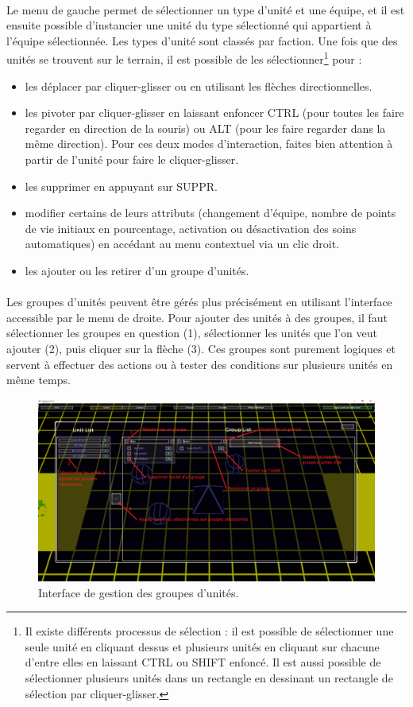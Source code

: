 \documentclass[a4paper]{article}
\begin{document}
\paragraph{ }
Le menu de gauche permet de sélectionner un type d'unité et une équipe, et il est ensuite possible d'instancier une unité du type sélectionné qui appartient à l'équipe sélectionnée. Les types d'unité sont classés par faction. Une fois que des unités se trouvent sur le terrain, il est possible de les sélectionner\footnote{Il existe différents processus de sélection : il est possible de sélectionner une seule unité en cliquant dessus et plusieurs unités en cliquant sur chacune d'entre elles en laissant CTRL ou SHIFT enfoncé. Il est aussi possible de sélectionner plusieurs unités dans un rectangle en dessinant un rectangle de sélection par cliquer-glisser.} pour :
\begin{itemize}
\item les déplacer par cliquer-glisser ou en utilisant les flèches directionnelles.
\item les pivoter par cliquer-glisser en laissant enfoncer CTRL (pour toutes les faire regarder en direction de la souris) ou ALT (pour les faire regarder dans la même direction). Pour ces deux modes d'interaction, faites bien attention à partir de l'unité pour faire le cliquer-glisser. 
\item les supprimer en appuyant sur SUPPR.
\item modifier certains de leurs attributs (changement d'équipe, nombre de points de vie initiaux en pourcentage, activation ou désactivation des soins automatiques) en accédant au menu contextuel via un clic droit.
\item les ajouter ou les retirer d'un groupe d'unités.
\end{itemize}
\paragraph{ }
Les groupes d'unités peuvent être gérés plus précisément en utilisant l'interface accessible par le menu de droite. Pour ajouter des unités à des groupes, il faut sélectionner les groupes en question (1), sélectionner les unités que l'on veut ajouter (2), puis cliquer sur la flèche (3). Ces groupes sont purement logiques et servent à effectuer des actions ou à tester des conditions sur plusieurs unités en même temps.
\begin{figure}[H]
\centering
\includegraphics[width=\linewidth]{editor-groups.png}
\caption{Interface de gestion des groupes d'unités.}
\label{fig:editor-groups}
\end{figure}
\end{document}
